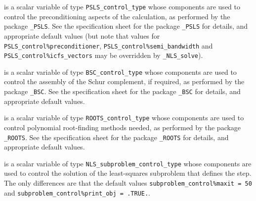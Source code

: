 \documentclass{galahad}
\newcommand{\packagename}{NLS}
\newcommand{\fullpackagename}{\libraryname\_\packagename}
\newcommand{\solver}{{\tt \fullpackagename\_solve}}
\begin{document}
\begin{description}
 is a scalar variable of type
{\tt PSLS\_control\_type}
whose components are used to control the preconditioning
aspects of the calculation, as performed by the package
{\tt \libraryname\_PSLS}.
See the specification sheet for the package
{\tt \libraryname\_PSLS}
for details, and appropriate default values (but note that values for
{\tt PSLS\_control\%prec\-onditioner},
{\tt PSLS\_control\%semi\_bandwidth} and
{\tt PSLS\_control\%icfs\_vectors}
may be overridden by \solver).

  is a scalar variable of type
{\tt BSC\_control\_type}
whose components are used to control the assembly of
the Schur complement, if required, as performed by the package
{\tt \libraryname\_BSC}.
See the specification sheet for the package
{\tt \libraryname\_BSC}
for details, and appropriate default values.

  is a scalar variable of type
{\tt ROOTS\_control\_type}
whose components are used to control polynomial root-finding methods needed,
as performed by the package {\tt \libraryname\_ROOTS}.
See the specification sheet for the package
{\tt \libraryname\_ROOTS}
for details, and appropriate default values.

  is a scalar variable of type
{\tt \packagename\_subproblem\_control\_type}
whose components are used to control the solution of the
least-squares subproblem that defines the step.
The only differences are that the default values
{\tt subproblem\_control\%maxit = 50} and
{\tt subproblem\_control\%print\_obj = .TRUE.}.
\end{description}

\end{document}

